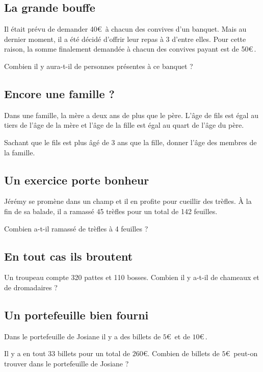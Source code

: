\documentclass[oneside,12pt]{article}          %
\begin{document}
\subsection{La grande bouffe}
Il était prévu de demander 40\euro\, à chacun des convives d’un banquet. Mais au dernier moment, il a
été décidé d’offrir leur repas à 3 d’entre elles. Pour cette raison, la somme finalement demandée à
chacun des convives payant est de 50\euro\,.

Combien il y aura-t-il de personnes présentes à ce banquet ?



\subsection{Encore une famille ?}
Dans une famille, la mère a deux ans de plus que le père. L’âge de fils est égal au tiers de l’âge de la mère et l’âge de la fille est égal au quart de l’âge du père.

Sachant que le fils est plus âgé de 3 ans que la fille, donner l’âge des membres de la famille.



\subsection{Un exercice porte bonheur}
Jérémy se promène dans un champ et il en profite pour cueillir des trèfles. À la fin de sa balade, il a
ramassé 45 trèfles pour un total de 142 feuilles.

Combien a-t-il ramassé de trèfles à 4 feuilles ?



\subsection{En tout cas ils broutent}
Un troupeau compte 320 pattes et 110 bosses. Combien il y a-t-il de chameaux et de dromadaires ?



\subsection{Un portefeuille bien fourni}
Dans le portefeuille de Josiane il y a des billets de $5$\euro\, et de $10$\euro\,.

Il y a en tout $33$ billets pour un total de $260$\euro. Combien de billets de $5$\euro\, peut-on trouver dans le portefeuille de Josiane ?
\end{document}
